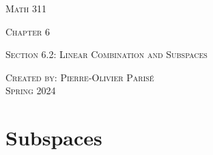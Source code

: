 \documentclass[20pt,a4paper]{extarticle}
\begin{document}
\thispagestyle{empty}

\begin{center}
\vspace*{0.75cm}

{\Huge \textsc{Math 311}}

\vspace*{1.5cm}

{\LARGE \textsc{Chapter 6}} 

\vspace*{0.75cm}

\noindent\textsc{Section 6.2: Linear Combination and Subspaces}

\vspace*{0.25cm}

\tableofcontents

\vfill

\noindent \textsc{Created by: Pierre-Olivier Paris{\'e}} \\
\textsc{Spring 2024}
\end{center}

\newpage


\section{Subspaces}
\end{document}
